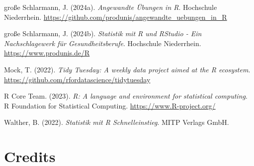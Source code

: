 \documentclass[
  11pt,
  a4paperpaper,
]{scrreprt}
\newlength{\cslhangindent}
\newenvironment{CSLReferences}[2] %
 {\begin{list}{}{%
  \setlength{\itemindent}{0pt}
  \setlength{\leftmargin}{0pt}
  \setlength{\parsep}{0pt}
  \ifodd #1
   \setlength{\leftmargin}{\cslhangindent}
   \setlength{\itemindent}{-1\cslhangindent}
  \fi
  \setlength{\itemsep}{#2\baselineskip}}}
 {\end{list}}
\begin{document}

\label{refs}
\begin{CSLReferences}{1}{0}
große Schlarmann, J. (2024a). \emph{Angewandte Übungen in {R}}.
Hochschule Niederrhein.
\url{https://github.com/produnis/angewandte_uebungen_in_R}

große Schlarmann, J. (2024b). \emph{Statistik mit {R} und {RStudio} -
{Ein} {Nachschlagewerk} für {Gesundheitsberufe}}. Hochschule
Niederrhein. \url{https://www.produnis.de/R}

Mock, T. (2022). \emph{Tidy Tuesday: A weekly data project aimed at the
R ecosystem}. \url{https://github.com/rfordatascience/tidytuesday}

R Core Team. (2023). \emph{R: {A} language and environment for
statistical computing}. R Foundation for Statistical Computing.
\url{https://www.R-project.org/}

Walther, B. (2022). \emph{Statistik mit {R} {Schnelleinstieg}}. MITP
Verlags GmbH.

\end{CSLReferences}


\chapter*{Credits}\label{credits}

\end{document}
